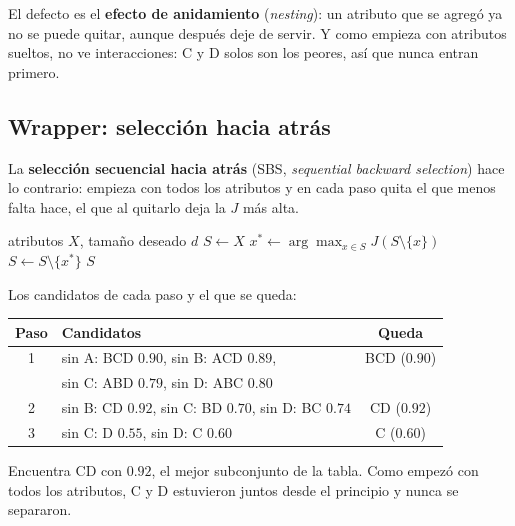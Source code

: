 \documentclass[11pt,letterpaper]{article}
\begin{document}
\begin{ojo}
    El defecto es el \textbf{efecto de anidamiento}
    (\textit{nesting}): un atributo que se agregó ya no se puede quitar,
    aunque después deje de servir. Y como empieza con atributos sueltos,
    no ve interacciones: C y D solos son los peores, así que nunca
    entran primero.
\end{ojo}


\subsection*{Wrapper: selección hacia atrás}

La \textbf{selección secuencial hacia atrás} (SBS,
\textit{sequential backward selection}) hace lo contrario: empieza con
todos los atributos y en cada paso quita el que menos falta hace, el
que al quitarlo deja la $J$ más alta.

\begin{algorithm}[H]
\caption{Selección hacia atrás}
\begin{algorithmic}[1]
\Require atributos $X$, tamaño deseado $d$
\State $S \gets X$
  \State $x^* \gets \arg\max_{x \in S} J(S \setminus \{x\})$
  \State $S \gets S \setminus \{x^*\}$
\EndWhile
\State \Return $S$
\end{algorithmic}
\end{algorithm}

\begin{ejemplo}
    Los candidatos de cada paso y el que se queda:
    \begin{center}
    \small
    \begin{tabular}{clc}
        \toprule
        \textbf{Paso} & \textbf{Candidatos} & \textbf{Queda} \\
        \midrule
        1 & sin A: BCD $0.90$, sin B: ACD $0.89$, & BCD ($0.90$) \\
          & sin C: ABD $0.79$, sin D: ABC $0.80$ & \\
        2 & sin B: CD $0.92$, sin C: BD $0.70$, sin D: BC $0.74$
          & CD ($0.92$) \\
        3 & sin C: D $0.55$, sin D: C $0.60$ & C ($0.60$) \\
        \bottomrule
    \end{tabular}
    \end{center}
    Encuentra CD con $0.92$, el mejor subconjunto de la tabla. Como
    empezó con todos los atributos, C y D estuvieron juntos desde el
    principio y nunca se separaron.
\end{ejemplo}
\end{document}
